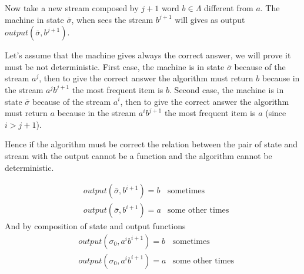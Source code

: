 \documentclass[a4paper]{article}
\begin{document}
Now take a new stream composed by $j + 1$ word $b \in \Lambda$ different from $a$.
The machine in state $\bar{\sigma}$, when sees the stream $b^{j + 1}$ will gives as output $output(\bar{\sigma}, b^{j + 1})$.

Let's assume that the machine gives always the correct answer, we will prove it must be not deterministic.
First case, the machine is in state $\bar{\sigma}$ because of the stream $a^j$, then to give the correct answer the algorithm must return $b$ because in the stream $a^jb^{j+ 1}$ the most frequent item is $b$.
Second case, the machine is in state $\bar{\sigma}$ because of the stream $a^i$, then to give the correct answer the algorithm must return $a$ because in the stream $a^ib^{j+ 1}$ the most frequent item is $a$ (since $i > j + 1$).

Hence if the algorithm must be correct the relation between the pair of state and stream with the output cannot be a function and the algorithm cannot be deterministic.

\begin{align*}
&output(\bar{\sigma}, b^{i+1}) = b &\mbox{sometimes}\\
&output(\bar{\sigma}, b^{i+1}) = a &\mbox{some other times}
\end{align*}
And by composition of state and output functions
\begin{align*}
&output(\sigma_0, a^ib^{i+1}) = b &\mbox{sometimes}\\
&output(\sigma_0, a^ib^{i+1}) = a &\mbox{some other times}
\end{align*}
\end{document}
